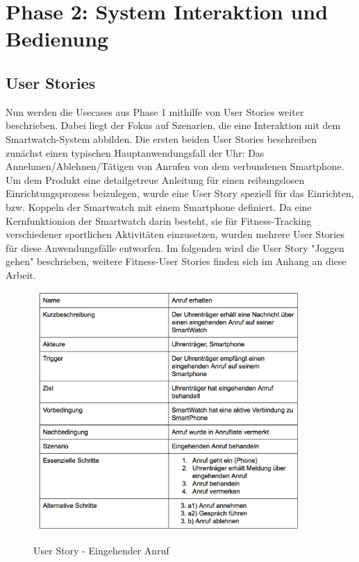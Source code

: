 \chapter{Phase 2: System Interaktion und Bedienung}

\section{User Stories}

Nun werden die Usecases aus Phase 1 mithilfe von User Stories weiter beschrieben. Dabei liegt der Fokus auf Szenarien, die eine Interaktion mit dem Smartwatch-System abbilden.
Die ersten beiden User Stories beschreiben zunächst einen typischen Hauptanwendungsfall der Uhr: Das Annehmen/Ablehnen/Tätigen von Anrufen von dem verbundenen Smartphone.
Um dem Produkt eine detailgetreue Anleitung für einen reibungslosen Einrichtungsprozess beizulegen, wurde eine User Story speziell für das Einrichten, bzw. Koppeln der Smartwatch mit einem Smartphone definiert.
Da eine Kernfunktionion der Smartwatch darin besteht, sie für Fitness-Tracking verschiedener sportlichen Aktivitäten einzusetzen, wurden mehrere User Stories für diese Anwendungsfälle entworfen. Im folgenden wird die User Story "Joggen gehen" beschrieben, weitere Fitness-User Stories finden sich im Anhang an diese Arbeit.
\begin{figure}[H]
\centering\
\includegraphics[width=10cm]{img/story_in}
\caption{User Story - Eingehender Anruf}\label{fig:story-in}
\end{figure}
